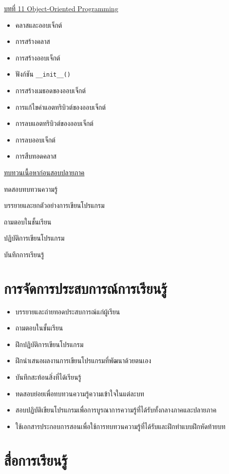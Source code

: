 {
\underline{บทที่ 11 Object-Oriented Programming}
\begin{itemize}
\item คลาสและออบเจ็กต์
\item การสร้างคลาส
\item การสร้างออบเจ็กต์
\item ฟังก์ชัน \texttt{\_\_init\_\_()}
\item การสร้างเมธอดของออบเจ็กต์
\item การแก้ไขค่าแอตทริบิวต์ของออบเจ็กต์
\item การลบแอตทริบิวต์ของออบเจ็กต์
\item การลบออบเจ็กต์
\item การสืบทอดคลาส
\end{itemize}

\underline{ทบทวนเนื้อหาก่อนสอบปลายภาค}
}
{
\item ทดสอบทบทวนความรู้
\item  บรรยายและยกตัวอย่างการเขียนโปรแกรม
\item  ถามตอบในชั้นเรียน
\item  ปฏิบัติการเขียนโปรแกรม
\item  บันทึกการเรียนรู้
}


\section*{การจัดการประสบการณ์การเรียนรู้}

\begin{tcolorbox}[breakable,enhanced,fonttitle=\bfseries]
\begin{itemize}
\item บรรยายและถ่ายทอดประสบการณ์แก่ผู้เรียน
\item ถามตอบในชั้นเรียน
\item ฝึกปฏิบัติการเขียนโปรแกรม
\item  ฝึกนำเสนอผลงานการเขียนโปรแกรมที่พัฒนาด้วยตนเอง
\item  บันทึกสะท้อนสิ่งที่ได้เรียนรู้
\item  ทดสอบย่อยเพื่อทบทวนความรู้ความเข้าใจในแต่ละบท
\item  สอบปฏิบัติเขียนโปรแกรมเพื่อการบูรณาการความรู้ที่ได้รับทั้งกลางภาคและปลายภาค
\item  ใช้เอกสารประกอบการสอนเพื่อใช้การทบทวนความรู้ที่ได้รับและฝึกทำแบบฝึกหัดท้ายบท
\end{itemize}
\end{tcolorbox}
\vspace{1.5cm}


\section*{สื่อการเรียนรู้}

